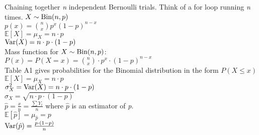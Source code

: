 \documentclass[letter, 12pt]{article}
\begin{document}
\begin{multicols}{2}
Chaining together \textit{n} independent Bernoulli trials. Think of a for loop running \textit{n} times.
\(X \sim \textnormal{Bin}(n, p)\)\\
\(p(x) = {n \choose x} p^x(1-p)^{n-x}\)\\
\(\mathds{E}[X] = \mu_X = n\cdot p\)\\
\(\textnormal{Var}(X) = n\cdot p\cdot(1-p)\)\\
Mass function for \(X \sim \textnormal{Bin}(n, p)\):\\
\(P(x) = P(X = x) = {n \choose x} \cdot p^x \cdot (1-p)^{n-x}\)\\
Table A1 gives probabilities for the Binomial distribution in the form \(P(X \leq x)\)\\
\(\mathds{E}[X] = \mu_X  = n\cdot p\)\\
\(\sigma^2_X = \textnormal{Var}(X) = n\cdot p \cdot (1-p)\)\\
\(\sigma_X = \sqrt{n\cdot p \cdot (1-p)}\)\\
\(\hat{p} = \frac{x}{n} = \frac{\sum Y_i}{n}\) where \(\hat{p}\) is an estimator of \textit{p}.\\
\(\mathds{E}[\hat{p}] = \mu_{\hat{p}}  = p\)\\
\(\textnormal{Var}(\hat{p}) = \frac{p\cdot (1-p)}{n}\)\\

\vfill
\columnbreak
\vspace*{\fill}
\end{multicols}
\newpage
\end{document}
